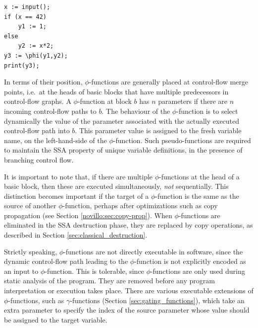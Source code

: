 \begin{verbatim}
x := input();
if (x == 42)
    y1 := 1;
else
    y2 := x*2;
y3 := \phi(y1,y2);
print(y3);
\end{verbatim}



In terms of their position, 
$\phi$-functions are generally placed at control-flow merge points,
i.e.\ at the heads of basic blocks that have multiple predecessors in
control-flow graphs.
A $\phi$-function at block $b$ has
$n$ parameters if there are $n$ incoming control-flow paths to $b$.
The behaviour of the $\phi$-function is to select dynamically
the value of the parameter associated with the actually executed
control-flow path into $b$.
This parameter value is assigned to the fresh variable name,
on the left-hand-side of the $\phi$-function.
Such pseudo-functions are required to maintain the SSA property
of unique variable definitions,
in the presence of branching control flow.


It is important to note that, if there are multiple $\phi$-functions
at the head of a basic block, then these are executed simultaneously,
\textit{not} sequentially.
This distinction becomes important if the target of a $\phi$-function
is the same as the source of another $\phi$-function, perhaps after
optimizations such as copy propagation
(see Section \ref{novillo:sec:copy-prop}).
When $\phi$-functions are eliminated in the SSA destruction phase,
they are replaced by %
copy operations,
as described in Section \ref{sec:classical_destruction}.

Strictly speaking, $\phi$-functions are not directly executable in software,
since the dynamic control-flow path leading to the $\phi$-function
is not explicitly encoded as an input to $\phi$-function.
This is tolerable, since $\phi$-functions are only 
used during static analysis of the program. They are removed
before any program interpretation or execution takes place.
There are various executable extensions of $\phi$-functions, 
such as $\gamma$-functions (Section \ref{sec:gating_functions}), which take
an extra parameter to specify the index of the source parameter whose
value should be assigned to the
target variable. 

